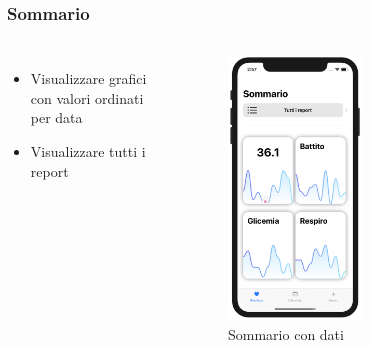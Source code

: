\documentclass{beamer}
\begin{document}
\begin{frame}
\frametitle {Sommario}
\begin{columns}
  \begin{itemize}
	\item Visualizzare grafici con valori ordinati per data 
	\item Visualizzare tutti i report
  \end{itemize}
	\begin{figure}[h]
        \includegraphics[width=0.55\textwidth]{../img/grafico2.png}
        \caption{Sommario con dati}
   \end{figure}
\end{columns}
\end{frame}
\end{document}
